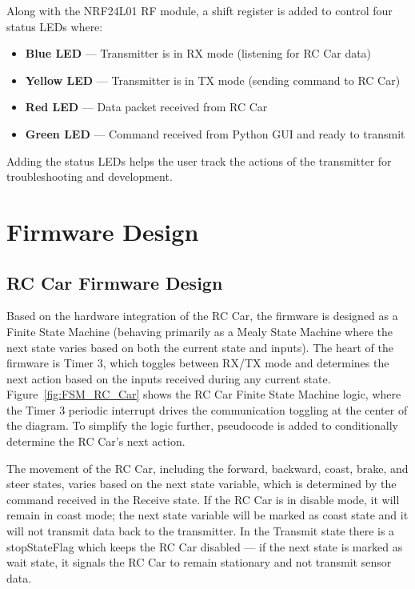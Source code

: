 \documentclass[conference]{IEEEtran}
\begin{document}
	Along with the NRF24L01 RF module, a shift register is added to control four
	status LEDs where:
	\begin{itemize}
		\item \textbf{Blue LED} — Transmitter is in RX mode (listening for RC Car data)
		\item \textbf{Yellow LED} — Transmitter is in TX mode (sending command to RC Car)
		\item \textbf{Red LED} — Data packet received from RC Car
		\item \textbf{Green LED} — Command received from Python GUI and ready to transmit
	\end{itemize}
	Adding the status LEDs helps the user track the actions of the transmitter for
	troubleshooting and development.
	
	
	\section{Firmware Design}
	\label{sec:firmware}
	\subsection{RC Car Firmware Design}
	
	Based on the hardware integration of the RC Car, the firmware is designed as a
	Finite State Machine (behaving primarily as a Mealy State Machine where the
	next state varies based on both the current state and inputs). The heart of the
	firmware is Timer 3, which toggles between RX/TX mode and determines the next
	action based on the inputs received during any current state. Figure~\ref{fig:FSM_RC_Car}
	shows the RC Car Finite State Machine logic, where the Timer 3 periodic
	interrupt drives the communication toggling at the center of the diagram. To
	simplify the logic further, pseudocode is added to conditionally determine the
	RC Car's next action.
	
	The movement of the RC Car, including the forward, backward, coast, brake, and
	steer states, varies based on the next state variable, which is determined by
	the command received in the Receive state. If the RC Car is in disable mode,
	it will remain in coast mode; the next state variable will be marked as coast
	state and it will not transmit data back to the transmitter. In the Transmit
	state there is a stopStateFlag which keeps the RC Car disabled — if
	the next state is marked as wait state, it signals the RC Car to remain
	stationary and not transmit sensor data.
	
\end{document}
